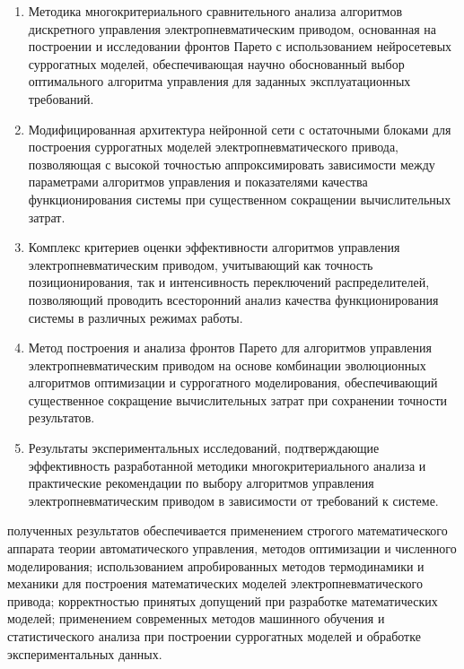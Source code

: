 {}
\begin{enumerate}[beginpenalty=10000] %

\item Методика многокритериального сравнительного анализа алгоритмов дискретного управления
электропневматическим приводом, основанная на построении и исследовании фронтов Парето
с использованием нейросетевых суррогатных моделей, обеспечивающая научно обоснованный
выбор оптимального алгоритма управления для заданных эксплуатационных требований.

\item Модифицированная архитектура нейронной сети с остаточными блоками для построения суррогатных моделей
электропневматического привода, позволяющая с высокой точностью
аппроксимировать зависимости между параметрами алгоритмов управления
и показателями качества функционирования системы при существенном сокращении вычислительных затрат.

\item Комплекс критериев оценки эффективности алгоритмов управления электропневматическим
приводом, учитывающий как точность позиционирования, так и интенсивность
переключений распределителей, позволяющий проводить всесторонний анализ качества
функционирования системы в различных режимах работы.

\item Метод построения и анализа фронтов Парето для алгоритмов управления электропневматическим
приводом на основе комбинации эволюционных алгоритмов оптимизации и суррогатного моделирования,
обеспечивающий существенное сокращение вычислительных затрат при сохранении точности результатов.

\item Результаты экспериментальных исследований, подтверждающие эффективность разработанной
методики многокритериального анализа и практические рекомендации по выбору алгоритмов
управления электропневматическим приводом в зависимости от требований к системе.

\end{enumerate}

{\reliability} 
полученных результатов обеспечивается применением строгого математического аппарата теории автоматического управления, 
методов оптимизации и численного моделирования; использованием апробированных методов термодинамики и механики для
построения математических моделей электропневматического привода; корректностью принятых допущений
при разработке математических моделей; применением современных методов машинного обучения и
статистического анализа при построении суррогатных моделей и обработке экспериментальных данных.

